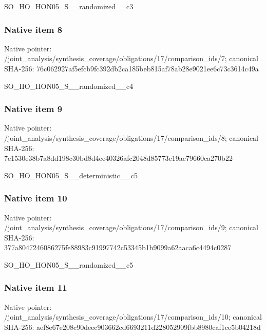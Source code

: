 \documentclass[10pt,a4paper]{article}
\begin{document}
\begingroup\raggedright\sloppy SO\_\allowbreak{}HO\_\allowbreak{}HON05\_\allowbreak{}S\_\allowbreak{}\_\allowbreak{}randomized\_\allowbreak{}\_\allowbreak{}c3\par\endgroup

\subsubsection{Native item 8}
Native pointer: /joint\_\allowbreak{}analysis/synthesis\_\allowbreak{}coverage/obligations/17/comparison\_\allowbreak{}ids/7; canonical SHA-256: 76c062927af5efcb9fc392db2ca185beb815af78ab28e9021ee6c73c3614c49a

\begingroup\raggedright\sloppy SO\_\allowbreak{}HO\_\allowbreak{}HON05\_\allowbreak{}S\_\allowbreak{}\_\allowbreak{}randomized\_\allowbreak{}\_\allowbreak{}c4\par\endgroup

\subsubsection{Native item 9}
Native pointer: /joint\_\allowbreak{}analysis/synthesis\_\allowbreak{}coverage/obligations/17/comparison\_\allowbreak{}ids/8; canonical SHA-256: 7e1530e38b7a8dd198c30bd8d4ee40326afc2048d85773c19ae79660ca270b22

\begingroup\raggedright\sloppy SO\_\allowbreak{}HO\_\allowbreak{}HON05\_\allowbreak{}S\_\allowbreak{}\_\allowbreak{}deterministic\_\allowbreak{}\_\allowbreak{}c5\par\endgroup

\subsubsection{Native item 10}
Native pointer: /joint\_\allowbreak{}analysis/synthesis\_\allowbreak{}coverage/obligations/17/comparison\_\allowbreak{}ids/9; canonical SHA-256: 377a8047246086275fe88983c91997742c53345b1b9099a62aaca6c4494c0287

\begingroup\raggedright\sloppy SO\_\allowbreak{}HO\_\allowbreak{}HON05\_\allowbreak{}S\_\allowbreak{}\_\allowbreak{}randomized\_\allowbreak{}\_\allowbreak{}c5\par\endgroup

\subsubsection{Native item 11}
Native pointer: /joint\_\allowbreak{}analysis/synthesis\_\allowbreak{}coverage/obligations/17/comparison\_\allowbreak{}ids/10; canonical SHA-256: aef8e67e208c90deec903662cd6693211d228052909fbb8980caf1ce5b04218d
\end{document}
